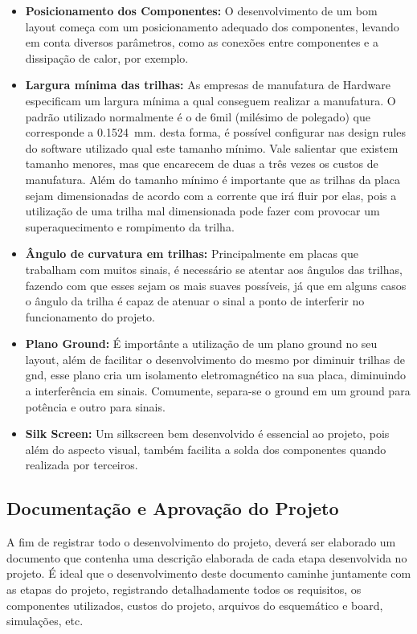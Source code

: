 \begin{itemize}
    \item \textbf{Posicionamento dos Componentes:}
    O desenvolvimento de um bom layout começa com um posicionamento adequado dos componentes, levando em conta diversos parâmetros, como as conexões entre componentes e a dissipação de calor, por exemplo.
    \item \textbf{Largura mínima das trilhas:}
    As empresas de manufatura de Hardware especificam um largura mínima a qual conseguem realizar a manufatura. O padrão utilizado normalmente é o de 6mil (milésimo de polegado) que corresponde a \SI{0.1524}{mm}. desta forma, é possível configurar nas  design rules do software utilizado qual este tamanho mínimo. Vale salientar que existem tamanho menores, mas que encarecem de duas a três vezes os custos de manufatura. Além do tamanho mínimo é importante que as trilhas da placa sejam dimensionadas de acordo com a corrente que irá fluir por elas, pois a utilização de uma trilha mal dimensionada pode fazer com provocar um superaquecimento e  rompimento da trilha.
    \item \textbf{Ângulo de curvatura em trilhas:}
    Principalmente em placas que trabalham com muitos sinais, é necessário se atentar aos ângulos das trilhas, fazendo com que esses sejam os mais suaves possíveis, já que em alguns casos o ângulo da trilha é capaz de atenuar o sinal a ponto de interferir no funcionamento do projeto.
    \item \textbf{Plano Ground:}
    É importânte a utilização de um plano ground no seu layout, além de facilitar o desenvolvimento do mesmo por diminuir trilhas de gnd, esse plano cria um isolamento eletromagnético na sua placa, diminuindo a interferência em sinais. Comumente, separa-se o ground em um ground para potência e outro para sinais.
    \item \textbf{Silk Screen:}
    Um silkscreen bem desenvolvido é essencial ao projeto, pois além do aspecto visual, também facilita a solda dos componentes quando realizada por terceiros.
\end{itemize}

\subsection{Documentação e Aprovação do Projeto}


A fim de registrar todo o desenvolvimento do projeto, deverá ser elaborado um documento que contenha uma descrição elaborada de cada etapa desenvolvida no projeto.  É ideal que o desenvolvimento deste documento caminhe juntamente com as etapas do projeto, registrando detalhadamente todos os requisitos, os componentes utilizados, custos do projeto, arquivos do esquemático e board, simulações, etc. 

